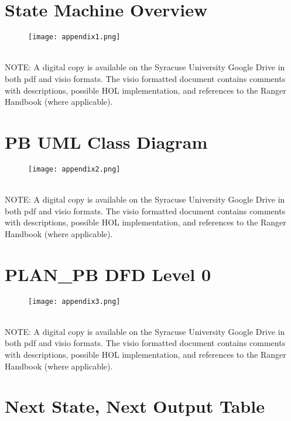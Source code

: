 \begin{landscape}
\chapter{State Machine Overview}
\label{cha:state-mach-overv}

\begin{figure}[h]
  \centering
  \texttt{[image: appendix1.png]}
\end{figure}\\
NOTE: A digital copy is available on the Syracuse University Google\textregistered
Drive in both pdf and visio formats. The visio formatted document contains
comments with descriptions, possible HOL implementation, and references
to the Ranger Handbook (where applicable).

\chapter{PB UML Class Diagram}
\label{cha:pb-uml-class}

\begin{figure}[h]
  \centering
  \texttt{[image: appendix2.png]}
\end{figure}\\
NOTE: A digital copy is available on the Syracuse University Google\textregistered
Drive in both pdf and visio formats. The visio formatted document contains
comments with descriptions, possible HOL implementation, and references
to the Ranger Handbook (where applicable).

\chapter{PLAN_PB DFD Level 0}
\label{cha:plan_pb-dfd-level}


\begin{figure}[h]
  \centering
  \texttt{[image: appendix3.png]}
\end{figure}\\
NOTE: A digital copy is available on the Syracuse University Google\textregistered
Drive in both pdf and visio formats. The visio formatted document contains
comments with descriptions, possible HOL implementation, and references
to the Ranger Handbook (where applicable).
\end{landscape}

\chapter{Next State, Next Output Table}
\label{cha:next-state-next}

